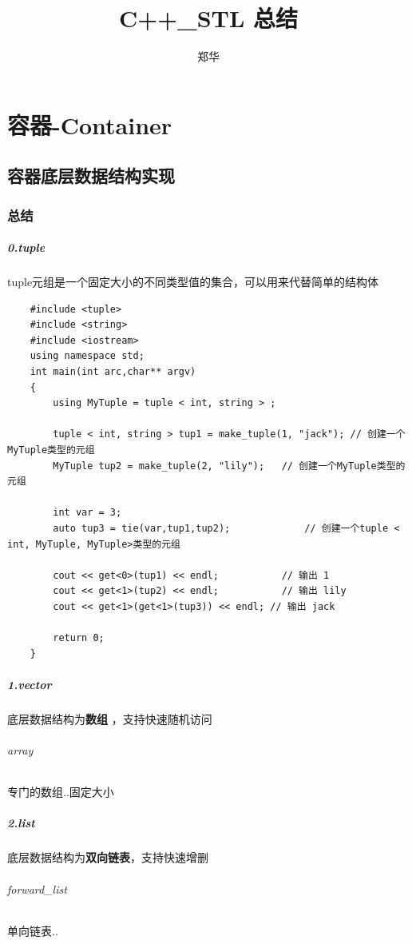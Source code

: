 \documentclass[UTF8,a4paper,12pt]{ctexbook}
\author{\kaishu 郑华}
\title{\textbf{C++\_STL 总结}}
\begin{document}
 
 	\maketitle
 	
 	\tableofcontents


		
		
		
\chapter{容器-Container}
\section{容器底层数据结构实现}
	\subsection{总结}
		 \paragraph{0.tuple}    tuple元组是一个固定大小的不同类型值的集合，可以用来代替简单的结构体
			 \begin{lstlisting}
	#include <tuple>
	#include <string>
	#include <iostream>
	using namespace std;
	int main(int arc,char** argv)
	{
		using MyTuple = tuple < int, string > ;
		
		tuple < int, string > tup1 = make_tuple(1, "jack");	// 创建一个MyTuple类型的元组
		MyTuple tup2 = make_tuple(2, "lily");	// 创建一个MyTuple类型的元组
		
		int var = 3;
		auto tup3 = tie(var,tup1,tup2);				// 创建一个tuple < int, MyTuple, MyTuple>类型的元组
		
		cout << get<0>(tup1) << endl;			// 输出 1
		cout << get<1>(tup2) << endl;			// 输出 lily
		cout << get<1>(get<1>(tup3)) << endl; // 输出 jack
		
		return 0;
	}
			 \end{lstlisting}
			 
		 \paragraph{1.vector}      底层数据结构为\textbf{数组} ，支持快速随机访问
			 \subparagraph{array}  专门的数组..固定大小
		 
		 \paragraph{2.list}            底层数据结构为\textbf{双向链表}，支持快速增删
			 \subparagraph{forward\_list} 单向链表..
		 
\end{document}
